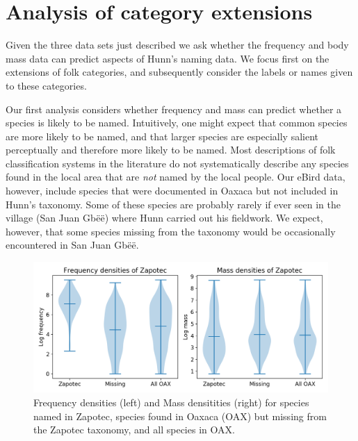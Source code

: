 \documentclass[10pt,letterpaper]{article}
\begin{document}
\section{Analysis of category extensions}

Given the three data sets just described we ask whether the frequency and body mass data can predict aspects of Hunn's naming data.  We focus first on the extensions of folk categories, and subsequently consider the labels or names given to these categories. 

Our first analysis considers whether frequency and mass can predict whether a species is likely to be named. Intuitively, one might expect that common species are more likely to be named, and that larger species are especially salient perceptually and therefore more likely to be named. Most descriptions of folk classification systems in the literature do not systematically describe any species found in the local area that are \emph{not} named by the local people. Our eBird data, however, include species that were documented in Oaxaca but not included in Hunn's taxonomy. Some of these species are probably rarely if ever seen in the village (San Juan Gb\"{e}\"{e}) where Hunn carried out his fieldwork. We expect, however, that some species missing from the taxonomy would be occasionally encountered in San Juan Gb\"{e}\"{e}. 

\begin{figure}[hbt!]
  \begin{center}
    \includegraphics[width=.95\textwidth]{./figures/birdfreqmass-violinplots.png}
        \caption{Frequency densities (left) and Mass densitities (right) for species named in Zapotec, species found in Oaxaca (OAX) but missing from the Zapotec taxonomy, and all species in OAX.}
        \label{fig-birdfreqmassviolin}
  \end{center}
\end{figure}
\end{document}
